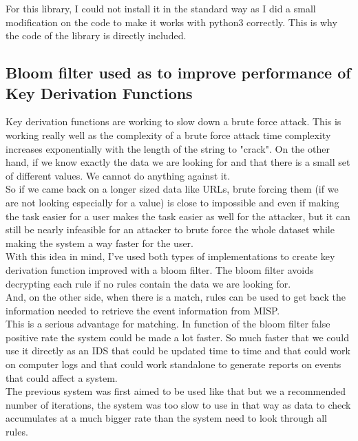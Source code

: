\documentclass{eplmastersthesis}
\begin{document}
For this library, I could not install it in the standard way as I did a small modification on the code to make it works with python3 correctly. This is why the code of the library is directly included.



\subsection{Bloom filter used as to improve performance of Key Derivation Functions}
Key derivation functions are working to slow down a brute force attack. This is working really well as the complexity of a brute force attack time complexity increases exponentially with the length of the string to "crack". On the other hand, if we know exactly the data we are looking for and that there is a small set of different values. We cannot do anything against it. \\

So if we came back on a longer sized data like URLs, brute forcing them (if we are not looking especially for a value) is close to impossible and even if making the task easier for a user makes the task easier as well for the attacker, but it can still be nearly infeasible for an attacker to brute force the whole dataset while making the system a way faster for the user.\\

With this idea in mind, I've used both types of implementations to create key derivation function improved with a bloom filter. The bloom filter avoids decrypting each rule if no rules contain the data we are looking for. \\
And, on the other side, when there is a match, rules can be used to get back the information needed to retrieve the event information from MISP.\\

This is a serious advantage for matching. In function of the bloom filter false positive rate the system could be made a lot faster. So much faster that we could use it directly as an IDS that could be updated time to time and that could work on computer logs and that could work standalone to generate reports on events that could affect a system.\\
The previous system was first aimed to be used like that but we a recommended number of iterations, the system was too slow to use in that way as data to check accumulates at a much bigger rate than the system need to look through all rules.\\
\end{document}
